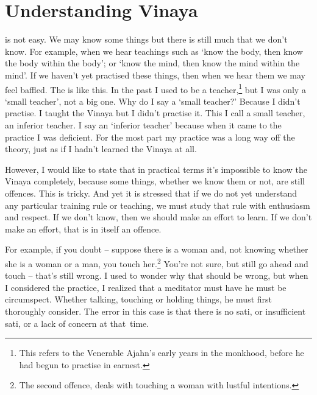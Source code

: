 
\chapter{Understanding Vinaya}

 is not easy. We may know some things but there is still much that we don't know. For example, when we hear teachings such as `know the body, then know the body within the body'; or `know the mind, then know the mind within the mind'. If we haven't yet practised these things, then when we hear them we may feel baffled. The  is like this. In the past I used to be a teacher,\footnote{This refers to the Venerable Ajahn's early years in the monkhood, before he had begun to practise in earnest.} but I was only a `small teacher', not a big one. Why do I say a `small teacher?' Because I didn't practise. I taught the Vinaya but I didn't practise it. This I call a small teacher, an inferior teacher. I say an `inferior teacher' because when it came to the practice I was deficient. For the most part my practice was a long way off the theory, just as if I hadn't learned the Vinaya at all.

However, I would like to state that in practical terms it's impossible to know the Vinaya completely, because some things, whether we know them or not, are still offences. This is tricky. And yet it is stressed that if we do not yet understand any particular training rule or teaching, we must study that rule with enthusiasm and respect. If we don't know, then we should make an effort to learn. If we don't make an effort, that is in itself an offence.

For example, if you doubt -- suppose there is a woman and, not knowing whether she is a woman or a man, you touch her.\footnote{The second  offence, deals with touching a woman with lustful intentions.} You're not sure, but still go ahead and touch -- that's still wrong. I used to wonder why that should be wrong, but when I considered the practice, I realized that a meditator must have  he must be circumspect. Whether talking, touching or holding things, he must first thoroughly consider. The error in this case is that there is no sati, or insufficient sati, or a lack of concern at that~time.

